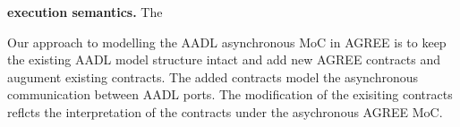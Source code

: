 {\bf execution semantics.}
The 




Our approach to modelling the AADL asynchronous MoC in AGREE is to keep the existing AADL model structure intact and add new AGREE contracts and augument existing contracts. The added contracts model the asynchronous communication between AADL ports. The modification of the exisiting contracts reflcts the interpretation of the contracts under the asychronous AGREE MoC. 



